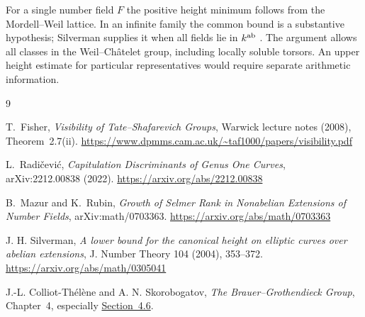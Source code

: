 \documentclass[11pt]{article}
\begin{document}
For a single number field $F$ the positive height minimum follows
from the Mordell--Weil lattice. In an infinite family the common
bound is a substantive hypothesis; Silverman supplies it when all
fields lie in $k^{\rm ab}$ \cite{SilvermanHeight}. The argument
allows all classes in the Weil--Ch\^atelet group, including locally
soluble torsors. An upper height estimate for particular representatives
would require separate arithmetic information.

\begin{thebibliography}{9}

T.~Fisher,
\emph{Visibility of Tate--Shafarevich Groups},
Warwick lecture notes (2008),
Theorem~2.7(ii).
\url{https://www.dpmms.cam.ac.uk/~taf1000/papers/visibility.pdf}

L.~Radi\v{c}evi\'c,
\emph{Capitulation Discriminants of Genus One Curves},
arXiv:2212.00838 (2022).
\url{https://arxiv.org/abs/2212.00838}

B.~Mazur and K.~Rubin,
\emph{Growth of Selmer Rank in Nonabelian Extensions
of Number Fields},
arXiv:math/0703363.
\url{https://arxiv.org/abs/math/0703363}

J. H. Silverman, \emph{A lower bound for the canonical height on
elliptic curves over abelian extensions}, J. Number Theory 104
(2004), 353--372. \url{https://arxiv.org/abs/math/0305041}

 J.-L. Colliot-Th\'el\`ene and A. N. Skorobogatov,
\emph{The Brauer--Grothendieck Group}, Chapter~4, especially
\href{https://www.imo.universite-paris-saclay.fr/~jean-louis.colliot-thelene/BGgroup_book.pdf}{Section~4.6}.

\end{thebibliography}
\end{document}
